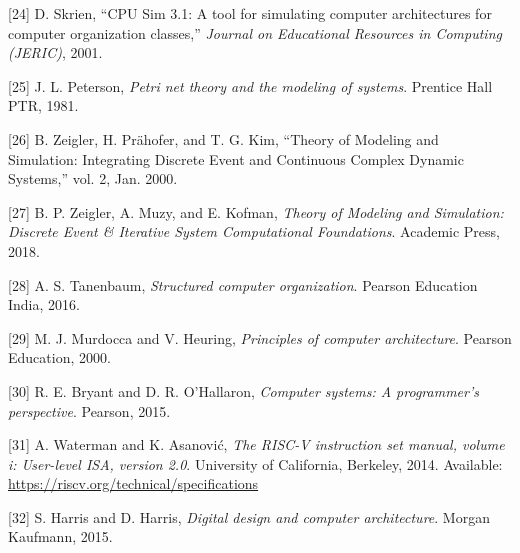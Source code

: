 \documentclass[12pt,oneside]{templates/unerthesis}
\newcommand{\CSLLeftMargin}[1]{#1} %
\newcommand{\CSLRightInline}[1]{#1} %
\newlength{\cslhangindent}
\newenvironment{CSLReferences}[2] %
 {\setlength{\parindent}{0pt}%
  \setlength{\leftskip}{#1 pt\relax}%
  \setlength{\parskip}{#2 pt\relax}%
  \everypar{\setlength{\hangindent}{\cslhangindent}}}
 {\par}
\begin{document}
\begin{CSLReferences}{0}{0}
\leavevmode{}%
\CSLLeftMargin{{[}24{]} }%
\CSLRightInline{D. Skrien, {``{CPU} {Sim} 3.1: {A} tool for simulating computer architectures for computer organization classes,''} \emph{Journal on Educational Resources in Computing (JERIC)}, 2001.}

\leavevmode{}%
\CSLLeftMargin{{[}25{]} }%
\CSLRightInline{J. L. Peterson, \emph{Petri net theory and the modeling of systems}. Prentice Hall PTR, 1981.}

\leavevmode{}%
\CSLLeftMargin{{[}26{]} }%
\CSLRightInline{B. Zeigler, H. Prähofer, and T. G. Kim, {``Theory of {Modeling} and {Simulation}: {Integrating} {Discrete} {Event} and {Continuous} {Complex} {Dynamic} {Systems},''} vol. 2, Jan. 2000.}

\leavevmode{}%
\CSLLeftMargin{{[}27{]} }%
\CSLRightInline{B. P. Zeigler, A. Muzy, and E. Kofman, \emph{Theory of {Modeling} and {Simulation}: {Discrete} {Event} \& {Iterative} {System} {Computational} {Foundations}}. Academic Press, 2018.}

\leavevmode{}%
\CSLLeftMargin{{[}28{]} }%
\CSLRightInline{A. S. Tanenbaum, \emph{Structured computer organization}. Pearson Education India, 2016.}

\leavevmode{}%
\CSLLeftMargin{{[}29{]} }%
\CSLRightInline{M. J. Murdocca and V. Heuring, \emph{Principles of computer architecture}. Pearson Education, 2000.}

\leavevmode{}%
\CSLLeftMargin{{[}30{]} }%
\CSLRightInline{R. E. Bryant and D. R. O'Hallaron, \emph{Computer systems: A programmer's perspective}. Pearson, 2015.}

\leavevmode{}%
\CSLLeftMargin{{[}31{]} }%
\CSLRightInline{A. Waterman and K. Asanović, \emph{The {RISC}-{V} instruction set manual, volume i: User-level ISA, version 2.0}. University of California, Berkeley, 2014. Available: \url{https://riscv.org/technical/specifications}}

\leavevmode{}%
\CSLLeftMargin{{[}32{]} }%
\CSLRightInline{S. Harris and D. Harris, \emph{Digital design and computer architecture}. Morgan Kaufmann, 2015.}


\end{CSLReferences}
\end{document}
